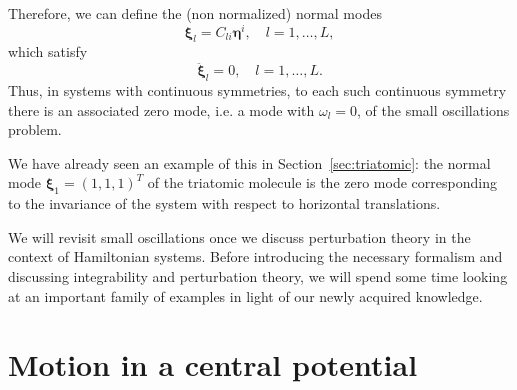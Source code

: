 \documentclass[english,fontsize=11pt,paper=a5,oneside]{scrbook}
\theoremstyle{definition}
\newenvironment{remark}
  {\pushQED{\qed}\renewcommand{\qedsymbol}{$\lozenge$}\remarkx}
  {\popQED\endremarkx}
\begin{document}
Therefore, we can define the (non normalized) normal modes
\begin{equation}
    \bm{\xi}_l = C_{li} \bm{\eta}^i, \quad l=1,\ldots, L,
\end{equation}
which satisfy
\begin{equation}
    \ddot{\bm{\xi}}_l = 0, \quad l=1,\ldots, L.
\end{equation}
Thus, in systems with continuous symmetries, to each such continuous symmetry there is an associated zero mode, i.e. a mode with $\omega_l = 0$, of the small oscillations problem.

\begin{remark}
We have already seen an example of this in Section~\ref{sec:triatomic}: the normal mode $\bm{\xi}_1=(1,1,1)^T$ of the triatomic molecule is the zero mode corresponding to the invariance of the system with respect to horizontal translations.
\end{remark}
\medskip

We will revisit small oscillations once we discuss perturbation theory in the context of Hamiltonian systems. Before introducing the necessary formalism and discussing integrability and perturbation theory, we will spend some time looking at an important family of examples in light of our newly acquired knowledge.

\section{Motion in a central potential}
\end{document}
